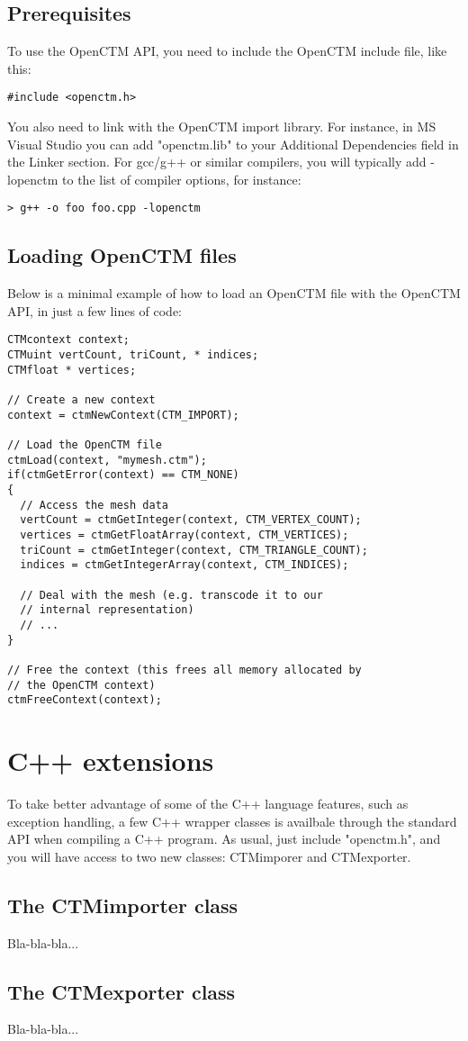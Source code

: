 \section{Prerequisites}
To use the OpenCTM API, you need to include the OpenCTM include file, like this:

\begin{lstlisting}
#include <openctm.h>
\end{lstlisting}

You also need to link with the OpenCTM import library. For instance, in MS
Visual Studio you can add "openctm.lib" to your Additional Dependencies field
in the Linker section. For gcc/g++ or similar compilers, you will typically
add -lopenctm to the list of compiler options, for instance:

\begin{lstlisting}
> g++ -o foo foo.cpp -lopenctm
\end{lstlisting}


\section{Loading OpenCTM files}
Below is a minimal example of how to load an OpenCTM file with the OpenCTM API,
in just a few lines of code:

\begin{lstlisting}
CTMcontext context;
CTMuint vertCount, triCount, * indices;
CTMfloat * vertices;

// Create a new context
context = ctmNewContext(CTM_IMPORT);

// Load the OpenCTM file
ctmLoad(context, "mymesh.ctm");
if(ctmGetError(context) == CTM_NONE)
{
  // Access the mesh data
  vertCount = ctmGetInteger(context, CTM_VERTEX_COUNT);
  vertices = ctmGetFloatArray(context, CTM_VERTICES);
  triCount = ctmGetInteger(context, CTM_TRIANGLE_COUNT);
  indices = ctmGetIntegerArray(context, CTM_INDICES);

  // Deal with the mesh (e.g. transcode it to our
  // internal representation)
  // ...
}

// Free the context (this frees all memory allocated by
// the OpenCTM context)
ctmFreeContext(context);
\end{lstlisting}




\chapter{C++ extensions}
To take better advantage of some of the C++ language features, such as
exception handling, a few C++ wrapper classes is availbale through the standard
API when compiling a C++ program. As usual, just include "openctm.h", and you
will have access to two new classes: CTMimporer and CTMexporter.


\section{The CTMimporter class}
Bla-bla-bla...


\section{The CTMexporter class}
Bla-bla-bla...




